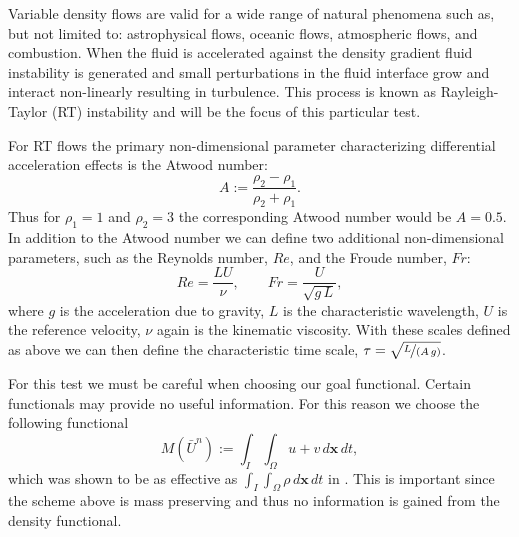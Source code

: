 \begin{test} \label{tst:rhoNSE}

    Variable density flows are valid for a wide range of natural phenomena such
    as, but not limited to: astrophysical flows, oceanic flows, atmospheric
    flows, and combustion. When the fluid is accelerated against the density
    gradient fluid instability is generated and small perturbations in the fluid
    interface grow and interact non-linearly resulting in turbulence.  This
    process is known as Rayleigh-Taylor (RT) instability and will be the focus of
    this particular test.

    For RT flows the primary non-dimensional parameter characterizing
    differential acceleration effects is the Atwood number:
    \begin{equation}
        A := \frac{\rho_2 - \rho_1}{\rho_2 + \rho_1}.
        \label{eq:Atwood}
    \end{equation}
    Thus for $\rho_1 = 1$ and $\rho_2 = 3$ the corresponding Atwood number would
    be $A = 0.5$. In addition to the Atwood number we can define two additional
    non-dimensional parameters, such as the Reynolds number, $Re$, and the
    Froude number, $Fr$:
    \begin{equation}
        Re = \frac{L U}{\nu}, \qquad Fr = \frac{U}{\sqrt{g\, L}},
        \label{eq:Re+Fr}
    \end{equation}
    where $g$ is the acceleration due to gravity, $L$ is the characteristic
    wavelength, $U$ is the reference velocity, $\nu$ again is the kinematic
    viscosity. With these scales defined as above we can then define the
    characteristic time scale, $\tau = \sqrt{\nicefrac{L}{(A\, g)}}$.

    For this test we must be careful when choosing our goal functional. Certain
    functionals may provide no useful information. For this reason we choose the
    following functional
    \begin{equation}
        M(\bar{U}^n) := \int_I\! \int_{\Omega}\! u + v\, d\mathbf{x}\, dt,
        \label{eq:FunctionalRhoNSE}
    \end{equation}
    which was shown to be as effective as $\int_I \int_{\Omega} \rho\,
    d\mathbf{x}\, dt$ in \cite{Izarra2014}. This is important since the scheme
    above is mass preserving and thus no information is gained from the density
    functional.

\end{test}
